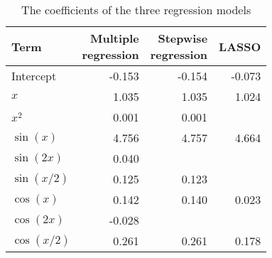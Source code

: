 \begin{table}[!h]

\caption{\label{tab:compare-coefs}The coefficients of the three regression models}
\centering
\begin{tabular}{lrrr}
\toprule
Term & \makecell[r]{Multiple\\regression} & \makecell[r]{Stepwise\\regression} & LASSO\\
\midrule
Intercept & -0.153 & -0.154 & -0.073\\
\(x\) & 1.035 & 1.035 & 1.024\\
\(x^2\) & 0.001 & 0.001 & \\
\(\sin(x)\) & 4.756 & 4.757 & 4.664\\
\(\sin(2x)\) & 0.040 &  & \\
\(\sin(x/2)\) & 0.125 & 0.123 & \\
\(\cos(x)\) & 0.142 & 0.140 & 0.023\\
\(\cos(2x)\) & -0.028 &  & \\
\(\cos(x/2)\) & 0.261 & 0.261 & 0.178\\
\bottomrule
\end{tabular}
\end{table}